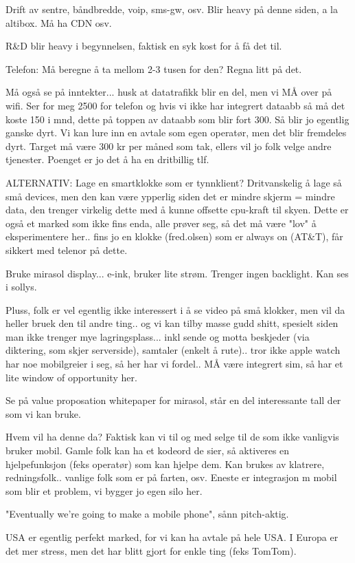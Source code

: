 Drift av sentre, båndbredde, voip, sms-gw, osv. Blir heavy på denne siden, a la
altibox. Må ha CDN osv.

R\&{}D blir heavy i begynnelsen, faktisk en syk kost for å få det til.

Telefon: Må beregne å ta mellom 2-3 tusen for den? Regna litt på det.

Må også se på inntekter... husk at datatrafikk blir en del, men vi MÅ over på
wifi. Ser for meg 2500 for telefon og hvis vi ikke har integrert dataabb så må
det koste 150 i mnd, dette på toppen av dataabb som blir fort 300. Så blir jo
egentlig ganske dyrt. Vi kan lure inn en avtale som egen operatør, men det blir
fremdeles dyrt. Target må være 300 kr per måned som tak, ellers vil jo folk
velge andre tjenester. Poenget er jo det å ha en dritbillig tlf.

ALTERNATIV: Lage en smartklokke som er tynnklient? Dritvanskelig å lage så små
devices, men den kan være ypperlig siden det er mindre skjerm = mindre data,
den trenger virkelig dette med å kunne offsette cpu-kraft til skyen. Dette er
også et marked som ikke fins enda, alle prøver seg, så det må være "lov" å
eksperimentere her.. fins jo en klokke (fred.olsen) som er always on (AT\&{}T),
får sikkert med telenor på dette.

Bruke mirasol display... e-ink, bruker lite strøm. Trenger ingen backlight. Kan
ses i sollys.

Pluss, folk er vel egentlig ikke interessert i å se video på små klokker, men
vil da heller bruek den til andre ting.. og vi kan tilby masse gudd shitt,
spesielt siden man ikke trenger mye lagringsplass... inkl sende og motta
beskjeder (via diktering, som skjer serverside), samtaler (enkelt å rute)..
tror ikke apple watch har noe mobilgreier i seg, så her har vi fordel.. MÅ være
integrert sim, så har et lite window of opportunity her.

Se på value proposation whitepaper for mirasol, står en del interessante tall
der som vi kan bruke.

Hvem vil ha denne da? Faktisk kan vi til og med selge til de som ikke vanligvis
bruker mobil. Gamle folk kan ha et kodeord de sier, så aktiveres en
hjelpefunksjon (feks operatør) som kan hjelpe dem. Kan brukes av klatrere,
redningsfolk.. vanlige folk som er på farten, osv. Eneste er integrasjon m
mobil som blir et problem, vi bygger jo egen silo her.

"Eventually we're going to make a mobile phone", sånn pitch-aktig.

USA er egentlig perfekt marked, for vi kan ha avtale på hele USA. I Europa er
det mer stress, men det har blitt gjort for enkle ting (feks TomTom).

